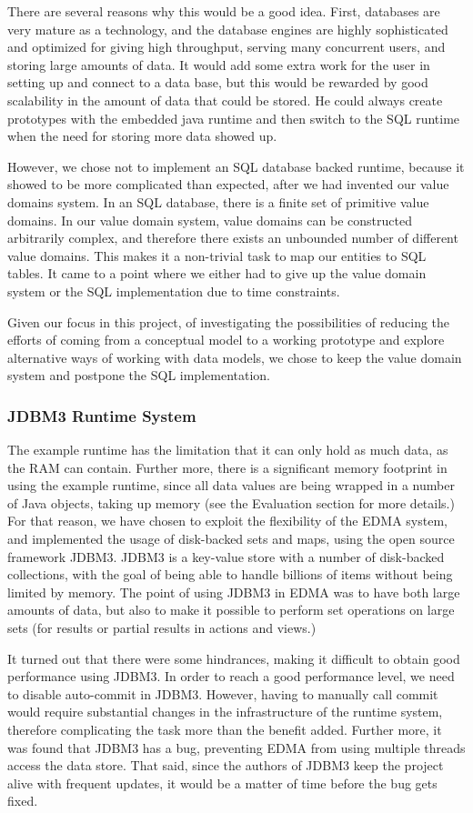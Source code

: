 There are several reasons why this would be a good idea. First, databases
are very mature as a technology, and the database engines are highly
sophisticated and optimized for giving high throughput, serving many
concurrent users, and storing large amounts of data. It would add
some extra work for the user in setting up and connect to a data base,
but this would be rewarded by good scalability in the amount of data
that could be stored. He could always create prototypes with the embedded
java runtime and then switch to the SQL runtime when the need for
storing more data showed up.

However, we chose not to implement an SQL database backed runtime,
because it showed to be more complicated than expected, after we had
invented our value domains system. In an SQL database, there is a
finite set of primitive value domains. In our value domain system,
value domains can be constructed arbitrarily complex, and therefore
there exists an unbounded number of different value domains. This
makes it a non-trivial task to map our entities to SQL tables. It
came to a point where we either had to give up the value domain system
or the SQL implementation due to time constraints.

Given our focus in this project, of investigating the possibilities
of reducing the efforts of coming from a conceptual model to a working
prototype and explore alternative ways of working with data models,
we chose to keep the value domain system and postpone the SQL implementation.


\subsubsection{JDBM3 Runtime System}

The example runtime has the limitation that it can only hold as much
data, as the RAM can contain. Further more, there is a significant
memory footprint in using the example runtime, since all data values
are being wrapped in a number of Java objects, taking up memory (see
the Evaluation section for more details.) For that reason, we have
chosen to exploit the flexibility of the EDMA system, and implemented
the usage of disk-backed sets and maps, using the open source framework
JDBM3. JDBM3 is a key-value store with a number of disk-backed collections,
with the goal of being able to handle billions of items without being
limited by memory. The point of using JDBM3 in EDMA was to have both
large amounts of data, but also to make it possible to perform set
operations on large sets (for results or partial results in actions
and views.)

It turned out that there were some hindrances, making it difficult
to obtain good performance using JDBM3. In order to reach a good performance
level, we need to disable auto-commit in JDBM3. However, having to
manually call commit would require substantial changes in the infrastructure
of the runtime system, therefore complicating the task more than the
benefit added. Further more, it was found that JDBM3 has a bug, preventing
EDMA from using multiple threads access the data store. That said,
since the authors of JDBM3 keep the project alive with frequent updates,
it would be a matter of time before the bug gets fixed.
